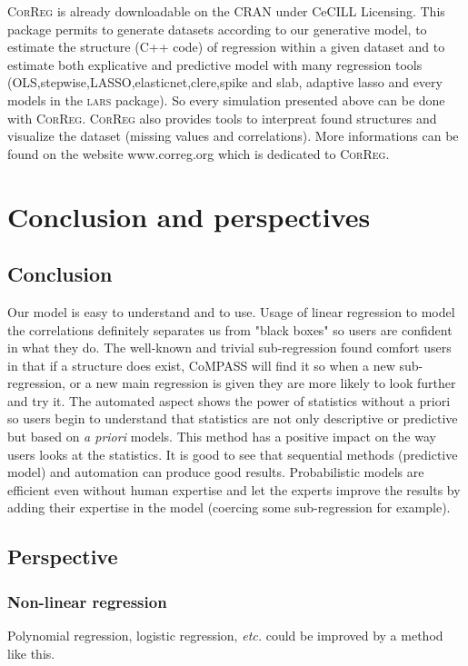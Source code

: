 \documentclass[11pt,a4paper]{report}
\begin{document}
		\textsc{CorReg} is already downloadable on the CRAN under CeCILL Licensing. This package permits to generate datasets according to our generative model, to estimate the structure (C++ code) of regression within a given dataset and to estimate both explicative and predictive model with many regression tools (OLS,stepwise,LASSO,elasticnet,clere,spike and slab, adaptive lasso and every models in the \textsc{lars} package). So every simulation presented above can be done with \textsc{CorReg}.
	\textsc{CorReg} also provides tools to interpreat found structures and visualize the dataset (missing values and correlations). More informations can be found on the website www.correg.org which is dedicated to \textsc{CorReg}.
	
\chapter{Conclusion and perspectives}
	\section{Conclusion}
		Our model is easy to understand and to use. Usage of linear regression to model the correlations definitely separates us from "black boxes" so users are confident in what they do. The well-known and trivial sub-regression found comfort users in that if a structure does exist, CoMPASS will find it so when a new sub-regression, or a new main regression is given they are more likely to look further and try it. The automated aspect shows the power of statistics without a priori so users begin to understand that statistics are not only descriptive or predictive but based on {\it a priori} models. This method has a positive impact on the way users looks at the statistics.
			It is good to see that sequential methods (predictive model) and automation can produce good results. Probabilistic models are efficient even without human expertise and let the experts improve the results by adding their expertise in the model (coercing some sub-regression for example).
		
		
	\section{Perspective}
		\subsection{Non-linear regression}
			Polynomial regression, logistic regression, {\it etc.} could be improved by a method like this.
\end{document}
